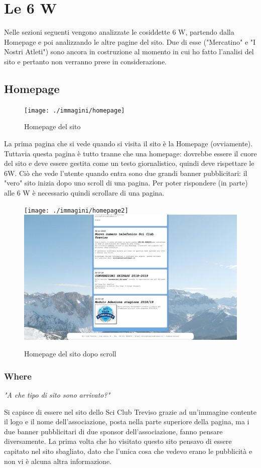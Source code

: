 
\chapter{Le 6 W}
\label{cap:le 6 w}
Nelle sezioni seguenti vengono analizzate le cosiddette 6 W, partendo dalla Homepage e poi analizzando le altre pagine del sito. Due di esse ("Mercatino" e "I Nostri Atleti") sono ancora in costruzione al momento in cui ho fatto l'analisi del sito e pertanto non verranno prese in considerazione.

\section{Homepage}
\begin{figure}[ht]
    \centering
    \texttt{[image: ./immagini/homepage]}
    \caption [Homepage del sito]{Homepage del sito \siteName}
\end{figure}
La prima pagina che si vede quando si visita il sito è la Homepage (ovviamente). Tuttavia questa pagina è tutto tranne che una homepage: dovrebbe essere il cuore del sito e deve essere gestita come un testo giornalistico, quindi deve rispettare le 6W. Ciò che vede l'utente quando entra sono due grandi banner pubblicitari: il "vero" sito inizia dopo uno scroll di una pagina. Per poter rispondere (in parte) alle 6 W è necessario quindi scrollare di una pagina.

\begin{figure}[H]
    \centering
    \texttt{[image: ./immagini/homepage2]}\hfil
    \includegraphics[width=.49\textwidth]{./immagini/homepage3}
    \caption [Homepage del sito 2]{Homepage del sito \siteName dopo scroll}
\end{figure}

    \subsection{Where}
        \begin{center}
            \textit{"A che tipo di sito sono arrivato?"}
        \end{center}
         Si capisce di essere nel sito dello Sci Club Treviso grazie ad un'immagine contente il logo e il nome dell'associazione, posta nella parte superiore della pagina, ma i due banner pubblicitari di due sponsor dell'associazione, fanno pensare diversamente. La prima volta che ho visitato questo sito pensavo di essere capitato nel sito sbagliato, dato che l'unica cosa che vedevo erano le pubblicità e non vi è alcuna altra informazione. 

